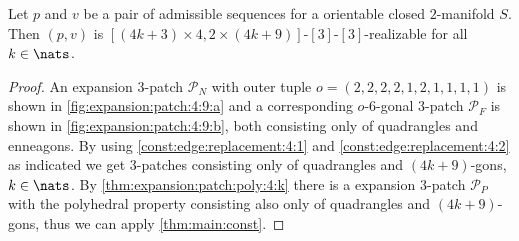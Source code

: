 \begin{theorem}
  Let $p$ and $v$ be a pair of admissible sequences for a orientable closed $2$-manifold $S$. Then $(p, v)$ is $[(4k + 3) \times 4, 2 \times (4k+9)]$-$[3]$-$[3]$-realizable for all $k \in \nats$.
  \begin{proof}
    An expansion $3$-patch $\mathcal{P}_N$ with outer tuple $o = (2, 2, 2, 2, 1, 2, 1, 1, 1, 1)$ is shown in \autoref{fig:expansion:patch:4:9:a} and a corresponding $o$-$6$-gonal $3$-patch $\mathcal{P}_F$ is shown in \autoref{fig:expansion:patch:4:9:b}, both consisting only of quadrangles and enneagons. By using \autoref{const:edge:replacement:4:1} and \autoref{const:edge:replacement:4:2} as indicated we get $3$-patches consisting only of quadrangles and $(4k+9)$-gons, $k \in \nats$. By \autoref{thm:expansion:patch:poly:4:k} there is a expansion $3$-patch $\mathcal{P}_P$ with the polyhedral property consisting also only of quadrangles and $(4k+9)$-gons, thus we can apply \autoref{thm:main:const}.
  \end{proof}
\end{theorem}
{\par\vspace*{\fill}}
